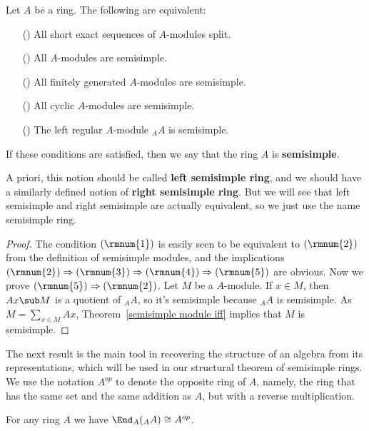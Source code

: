 \begin{theorem}\label{semisimple ring iff}
Let $A$ be a ring. The following are equivalent:
\begin{itemize}
\item[(\rmnum{1})] All short exact sequences of $A$-modules split.
\item[(\rmnum{2})] All $A$-modules are semisimple.
\item[(\rmnum{3})] All finitely generated $A$-modules are semisimple.
\item[(\rmnum{4})] All cyclic $A$-modules are semisimple.
\item[(\rmnum{5})] The left regular $A$-module $_{A}A$ is semisimple.
\end{itemize}
If these conditions are satisfied, then we say that the ring $A$ is \textbf{semisimple}.
\end{theorem}
A priori, this notion should be called \textbf{left semisimple ring}, and we should have a similarly defined notion of \textbf{right semisimple ring}. But we will see that left semisimple and right semisimple are actually equivalent, so we just use the name semisimple ring.
\begin{proof}
The condition $(\rmnum{1})$ is easily seen to be equivalent to $(\rmnum{2})$ from the definition of semisimple modules, and the implications $(\rmnum{2})\Rightarrow(\rmnum{3})\Rightarrow(\rmnum{4})\Rightarrow(\rmnum{5})$ are obvious. Now we prove $(\rmnum{5})\Rightarrow(\rmnum{2})$. Let $M$ be a $A$-module. If $x\in M$, then $Ax\sub M$ is a quotient of $_{A}A$, so it's semisimple because $_{A}A$ is semisimple. As $M=\sum_{x\in M}Ax$, Theorem~\ref{semisimple module iff} implies that $M$ is semisimple.
\end{proof}
The next result is the main tool in recovering the structure of an algebra from its representations, which will be used in our structural theorem of semisimple rings. We use the notation $A^{op}$ to denote the opposite ring of $A$, namely, the ring that has the same set and the same addition as $A$, but with a reverse multiplication.
\begin{lemma}\label{endomorphism of _AA is right multiplication}
For any ring $A$ we have $\End_A(_{A}A)\cong A^{op}$.
\end{lemma}
